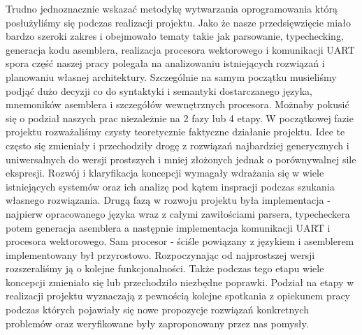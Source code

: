 Trudno jednoznacznie wskazać metodykę wytwarzania oprogramowania którą posłużyliśmy się podczas realizacji projektu. Jako że nasze przedsięwzięcie miało bardzo szeroki zakres i obejmowało tematy takie jak parsowanie, typechecking, generacja kodu asemblera, realizacja procesora wektorowego i komunikacji UART spora część naszej pracy polegała na analizowaniu istniejących rozwiązań i planowaniu własnej architektury. Szczególnie na samym początku musieliśmy podjąć dużo decyzji co do syntaktyki i semantyki dostarczanego języka, mnemoników asemblera i szczegółów wewnętrznych procesora. Możnaby pokusić się o podział naszych prac niezależnie na 2 fazy lub 4 etapy. W początkowej fazie projektu rozważaliśmy czysty teoretycznie faktyczne działanie projektu. Idee te często się zmieniały i przechodziły drogę z rozwiązań najbardziej generycznych i uniwersalnych do wersji prostszych i mniej złożonych jednak o porównywalnej sile ekspresji. Rozwój i klaryfikacja koncepcji wymagały wdrażania się w wiele istniejących systemów oraz ich analizę pod kątem inspracji podczas szukania własnego rozwiązania. Drugą fazą w rozwoju projektu była implementacja - najpierw opracowanego języka wraz z całymi zawiłościami parsera, typecheckera potem generacja asemblera a następnie implementacja komunikacji UART i procesora wektorowego. Sam procesor - ściśle powiązany z językiem i asemblerem implementowany był przyrostowo. Rozpoczynając od najprostszej wersji rozszeraliśmy ją o kolejne funkcjonalności. Także podczas tego etapu wiele koncepcji zmieniało się lub przechodziło niezbędne poprawki. Podział na etapy w realizacji projektu wyznaczają z pewnością kolejne spotkania z opiekunem pracy podczas których pojawiały się nowe propozycje rozwiązań konkretnych problemów oraz weryfikowane były zaproponowany przez nas pomysły.